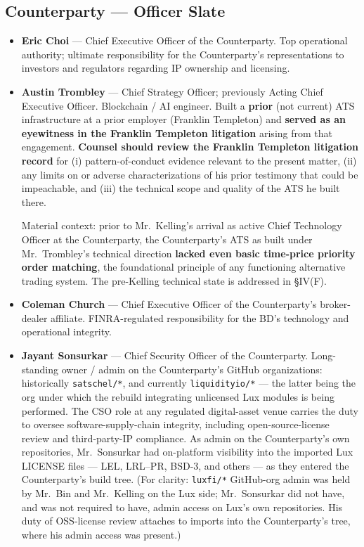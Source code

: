\documentclass[11pt,letterpaper]{article}
\begin{document}
\subsection*{Counterparty --- Officer Slate}

\begin{itemize}[leftmargin=1.5em,itemsep=0.2em]
\item \textbf{Eric Choi} --- Chief Executive Officer of the
Counterparty. Top operational authority; ultimate responsibility for
the Counterparty's representations to investors and regulators
regarding IP ownership and licensing.
\item \textbf{Austin Trombley} --- Chief Strategy Officer; previously
Acting Chief Executive Officer. Blockchain / AI engineer. Built a
\textbf{prior} (not current) ATS infrastructure at a prior employer
(Franklin Templeton) and \textbf{served as an eyewitness in the
Franklin Templeton litigation} arising from that engagement.
\textbf{Counsel should review the Franklin Templeton litigation
record} for (i) pattern-of-conduct evidence relevant to the present
matter, (ii) any limits on or adverse characterizations of his prior
testimony that could be impeachable, and (iii) the technical scope and
quality of the ATS he built there.

Material context: prior to Mr.\ Kelling's arrival as active Chief
Technology Officer at the Counterparty, the Counterparty's ATS as
built under Mr.\ Trombley's technical direction \textbf{lacked even
basic time-price priority order matching}, the foundational principle
of any functioning alternative trading system. The pre-Kelling
technical state is addressed in \S IV(F).
\item \textbf{Coleman Church} --- Chief Executive Officer of the
Counterparty's broker-dealer affiliate. FINRA-regulated responsibility
for the BD's technology and operational integrity.
\item \textbf{Jayant Sonsurkar} --- Chief Security Officer of the
Counterparty. Long-standing owner / admin on the Counterparty's GitHub
organizations: historically \texttt{satschel/*}, and currently
\texttt{liquidityio/*} --- the latter being the org under which the
rebuild integrating unlicensed Lux modules is being performed. The
CSO role at any regulated digital-asset venue carries the duty to
oversee software-supply-chain integrity, including open-source-license
review and third-party-IP compliance. As admin on the Counterparty's
own repositories, Mr.\ Sonsurkar had on-platform visibility into the
imported Lux LICENSE files --- LEL, LRL--PR, BSD-3, and others ---
as they entered the Counterparty's build tree. (For clarity:
\texttt{luxfi/*} GitHub-org admin was held by Mr.\ Bin and Mr.\
Kelling on the Lux side; Mr.\ Sonsurkar did not have, and was not
required to have, admin access on Lux's own repositories. His
duty of OSS-license review attaches to imports into the
Counterparty's tree, where his admin access was present.)
\end{itemize}
\end{document}
